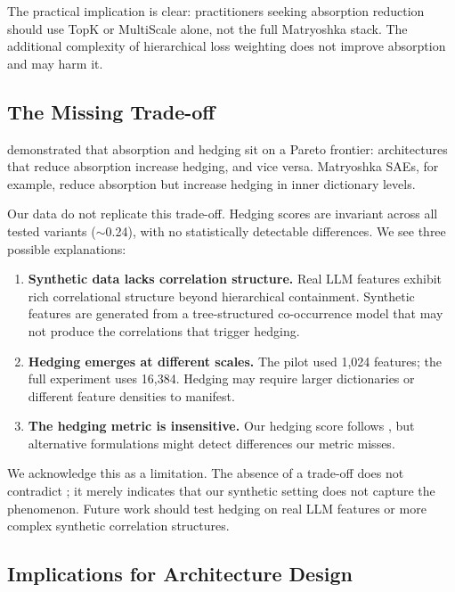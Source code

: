 \documentclass{article}
\begin{document}
The practical implication is clear: practitioners seeking absorption reduction should use TopK or MultiScale alone, not the full Matryoshka stack. The additional complexity of hierarchical loss weighting does not improve absorption and may harm it.

\subsection{The Missing Trade-off}\label{sec:missing-tradeoff}

\citet{chanin2025hedging} demonstrated that absorption and hedging sit on a Pareto frontier: architectures that reduce absorption increase hedging, and vice versa. Matryoshka SAEs, for example, reduce absorption but increase hedging in inner dictionary levels.

Our data do not replicate this trade-off. Hedging scores are invariant across all tested variants ($\sim$0.24), with no statistically detectable differences. We see three possible explanations:

\begin{enumerate}
\item \textbf{Synthetic data lacks correlation structure.} Real LLM features exhibit rich correlational structure beyond hierarchical containment. Synthetic features are generated from a tree-structured co-occurrence model that may not produce the correlations that trigger hedging.

\item \textbf{Hedging emerges at different scales.} The pilot used 1,024 features; the full experiment uses 16,384. Hedging may require larger dictionaries or different feature densities to manifest.

\item \textbf{The hedging metric is insensitive.} Our hedging score follows \citet{chanin2025hedging}, but alternative formulations might detect differences our metric misses.
\end{enumerate}

We acknowledge this as a limitation. The absence of a trade-off does not contradict \citet{chanin2025hedging}; it merely indicates that our synthetic setting does not capture the phenomenon. Future work should test hedging on real LLM features or more complex synthetic correlation structures.

\subsection{Implications for Architecture Design}
\end{document}
